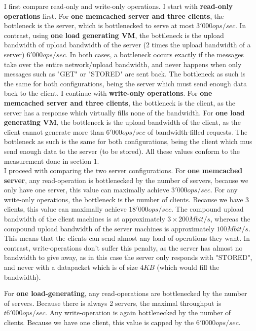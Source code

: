 \documentclass[11pt,a4paper]{article}
\begin{document}
I first compare read-only and write-only operations.
I start with \textbf{read-only operations} first.
For \textbf{one memcached server and three clients}, the bottleneck is the server, which is bottlenecked to serve at most $3'000 ops/sec $.
In contrast, using \textbf{one load generating VM}, the bottleneck is the upload bandwidth of upload bandwidth of the server (2 times the upload bandwidth of a server) $6'000 ops/sec$. 
In both cases, a bottleneck occurs exactly if the messages take over the entire network/upload bandwidth, and never happens when only messages such as "GET" or "STORED" are sent back.
The bottleneck as such is the same for both configurations, being the server which must send enough data back to the client.
I continue with \textbf{write-only operations}.
For \textbf{one memcached server and three clients}, the bottleneck is the client, as the server has a response which virtually fills none of the bandwidth.
For \textbf{one load generating VM}, the bottleneck is the upload bandwidth of the client, as the client cannot generate more than $6'000 ops/sec$ of bandwidth-filled requests.
The bottleneck as such is the same for both configurations, being the client which mus send enough data to the server (to be stored). 
All these values conform to the measurement done in section 1.\\

I proceed with comparing the two server configurations.
For \textbf{one memcached server}, any read-operation is bottlenecked by the number of servers, because we only have one server, this value can maximally achieve $3'000 ops/sec$.
For any write-only operations, the bottleneck is the number of clients. 
Because we have 3 clients, this value can maximally achieve $18'000 ops/sec$.
The compound upload bandwidth of the client machines is at approximately $3 \times 200 Mbit/s$, whereas the compound upload bandwidth of the server machines is approximately $100 Mbit/s$.
This means that the clients can send almost any load of operations they want.
In contrast, write-operations don't suffer this penalty, as the server has almost no bandwidth to give away, as in this case the server only responds with "STORED", and never with a datapacket which is of size $4KB$ (which would fill the bandwidth). 

For \textbf{one load-generating}, any read-operations are bottlenecked by the number of servers. Because there is always 2 servers, the maximal throughput is $t6'000 ops / sec$.
Any write-operation is again bottlenecked by the number of clients.
Because we have one client, this value is capped by the $6'0000 ops / sec$.
\end{document}
